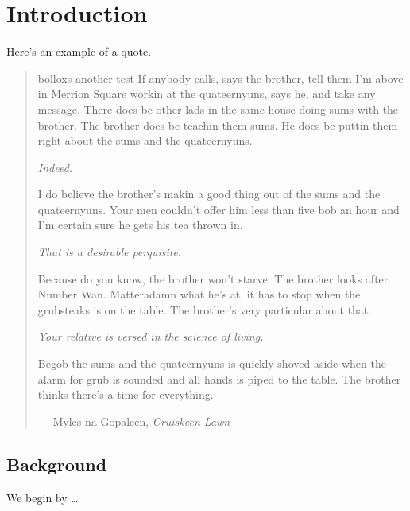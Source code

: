 %
%
%
%

\chapter{Introduction}\label{C.intro}



Here's an example of a quote.

\begin{quote}
bolloxs another test
If anybody calls, says the brother, tell them I'm above in Merrion Square workin at the
quateernyuns, says he, and take any message.  There does be other lads in the same house
doing sums with the brother.  The brother does be teachin them sums.  He does be puttin
them right about the sums and the quateernyuns.

\textit{Indeed.}

I do believe the brother's makin a good thing out of the sums and the quateernyuns.  Your
men couldn't offer him less than five bob an hour and I'm certain sure he gets his tea
thrown in.

\textit{That is a desirable perquisite.}

Because do you know, the brother won't starve.  The brother looks after Number Wan.
Matteradamn what he's at, it has to stop when the grubsteaks is on the table.  The brother's
very particular about that.

\textit{Your relative is versed in the science of living.}

Begob the sums and the quateernyuns is quickly shoved aside when the alarm for grub is sounded
and all hands is piped to the table.  The brother thinks there's a time for everything.

\hspace{2cm}--- Myles na Gopaleen, \emph{Cruiskeen Lawn}
\end{quote}


\section{Background}\label{S.intro1}

We begin by \ldots

